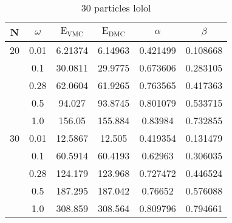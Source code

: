 \newpage\begin{table}

\begin{center}
\label{}
\begin{tabular}{cc|cccc}
    N     & $\omega$ & $\mathrm{E_{VMC}}$ & $\mathrm{E_{DMC}}$ & $\alpha$ & $\beta$  \\
\hline
    20    &   0.01   & 6.21374  & 6.14963  & 0.421499 & 0.108668 \\
          &   0.1    & 30.0811  & 29.9775  & 0.673606 & 0.283105 \\
          &   0.28   & 62.0604  & 61.9265  & 0.763565 & 0.417363 \\
          &   0.5    &  94.027  & 93.8745  & 0.801079 & 0.533715 \\
          &   1.0    &  156.05  & 155.884  & 0.83984  & 0.732855 \\
    30    &   0.01   & 12.5867  &  12.505  & 0.419354 & 0.131479 \\
          &   0.1    & 60.5914  & 60.4193  & 0.62963  & 0.306035 \\
          &   0.28   & 124.179  & 123.968  & 0.727472 & 0.446524 \\
          &   0.5    & 187.295  & 187.042  & 0.76652  & 0.576088 \\
          &   1.0    & 308.859  & 308.564  & 0.809796 & 0.794661 \\
\end{tabular}
\caption{30 particles lolol}
\end{center}
\end{table}

